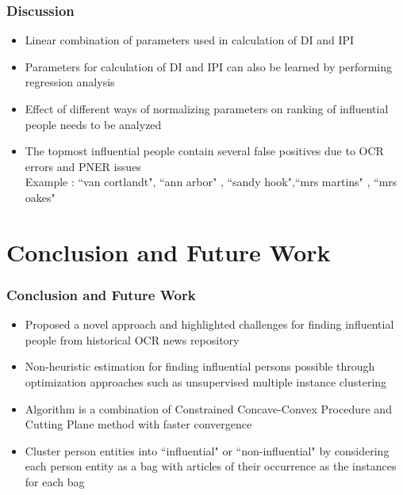 \documentclass{beamer}
\begin{document}
\begin{frame}
\frametitle{Discussion}
\begin{itemize}
\item
 Linear combination of  parameters used in calculation of DI and IPI

\item
Parameters for calculation of DI and IPI can also be learned by performing regression analysis

\item
Effect of different ways of normalizing parameters on ranking of influential people needs to be analyzed

\item
The topmost influential people contain several false positives due to OCR errors and PNER issues\\
\alert{Example} : ``van cortlandt", ``ann arbor" , ``sandy hook",``mrs martins" , ``mrs oakes"

\end{itemize}
\end{frame}

\section{Conclusion and Future Work}
\begin{frame}
\frametitle{Conclusion and Future Work}
\begin{itemize}
\item
Proposed a novel approach and highlighted challenges for finding influential people from historical OCR news repository

\item
Non-heuristic estimation for finding influential persons possible through optimization approaches such as unsupervised multiple instance clustering\cite{zhang2009m3ic}
\pause
\item
 Algorithm is a combination of Constrained Concave-Convex Procedure and Cutting Plane method with faster convergence
\pause
\item 
Cluster person entities into ``influential" or ``non-influential" by considering each person entity as a bag with articles of their occurrence as the instances for each bag

\end{itemize}
\end{frame}
\end{document}
